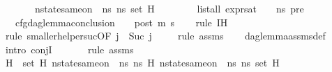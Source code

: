 \begin{isabellebody}
\ \ \ \ \ \ \ {\isachardoublequoteopen}nstate{\isacharunderscore}{\kern0pt}same{\isacharunderscore}{\kern0pt}on\ {\isasymLambda}\ ns{}\ ns{}\ {\isacharparenleft}{\kern0pt}set\ H{}{\isacharparenright}{\kern0pt}{\isachardoublequoteclose}\ \isanewline
\ \ \ \ \ \ \ {\isachardoublequoteopen}list{\isacharunderscore}{\kern0pt}all\ {\isacharparenleft}{\kern0pt}expr{\isacharunderscore}{\kern0pt}sat\ {\isasymLambda}\ {\isasymGamma}\ {\isasymOmega}\ ns{}{\isacharprime}{\kern0pt}{\isacharprime}{\kern0pt}{\isacharparenright}{\kern0pt}\ pre{\isachardoublequoteclose}\isanewline
\ \ \ {\isachardoublequoteopen}cfg{\isacharunderscore}{\kern0pt}dag{\isacharunderscore}{\kern0pt}lemma{\isacharunderscore}{\kern0pt}conclusion\ {\isasymLambda}\ {\isasymGamma}\ {\isasymOmega}\ post\ m{\isacharprime}{\kern0pt}\ s{\isacharprime}{\kern0pt}{\isachardoublequoteclose}\isanewline
%
\isadelimproof
\ \ %
\endisadelimproof
%
\isatagproof
{}\isamarkupfalse%
\ {\isacharparenleft}{\kern0pt}rule\ IH{\isacharparenright}{\kern0pt}\isanewline
\ \ \ \ \isamarkupfalse%
\ {\isacharparenleft}{\kern0pt}rule\ smaller{\isacharunderscore}{\kern0pt}helper{\isacharunderscore}{\kern0pt}suc{\isacharbrackleft}{\kern0pt}OF\ {\isacartoucheopen}j\ {\isacharequal}{\kern0pt}\ Suc\ j{\isacharprime}{\kern0pt}{\isacartoucheclose}{\isacharbrackright}{\kern0pt}{\isacharparenright}{\kern0pt}\isanewline
\ \ \ \isamarkupfalse%
\ {\isacharparenleft}{\kern0pt}rule\ assms{\isacharparenleft}{\kern0pt}{}{\isacharparenright}{\kern0pt}{\isacharparenright}{\kern0pt}\isanewline
\ \ \isamarkupfalse%
\ dag{\isacharunderscore}{\kern0pt}lemma{\isacharunderscore}{\kern0pt}assms{\isacharunderscore}{\kern0pt}def\isanewline
\ \ \isamarkupfalse%
\ {\isacharparenleft}{\kern0pt}intro\ conjI{\isacharparenright}{\kern0pt}\isanewline
\ \ \ \ \ \isamarkupfalse%
\ {\isacharparenleft}{\kern0pt}rule\ assms{\isacharparenleft}{\kern0pt}{}{\isacharparenright}{\kern0pt}{\isacharparenright}{\kern0pt}\isanewline
\ \ \isamarkupfalse%
\ {\isacartoucheopen}H{}\ {\isasymsubseteq}\ set\ H{}{\isacartoucheclose}\ {\isacartoucheopen}nstate{\isacharunderscore}{\kern0pt}same{\isacharunderscore}{\kern0pt}on\ {\isasymLambda}\ ns{}\ ns{}{\isacharprime}{\kern0pt}{\isacharprime}{\kern0pt}\ H{}{\isacartoucheclose}\ {\isacartoucheopen}nstate{\isacharunderscore}{\kern0pt}same{\isacharunderscore}{\kern0pt}on\ {\isasymLambda}\ ns{}\ ns{}\ {\isacharparenleft}{\kern0pt}set\ H{}{\isacharparenright}{\kern0pt}{\isacartoucheclose}\isanewline

\end{isabellebody}
